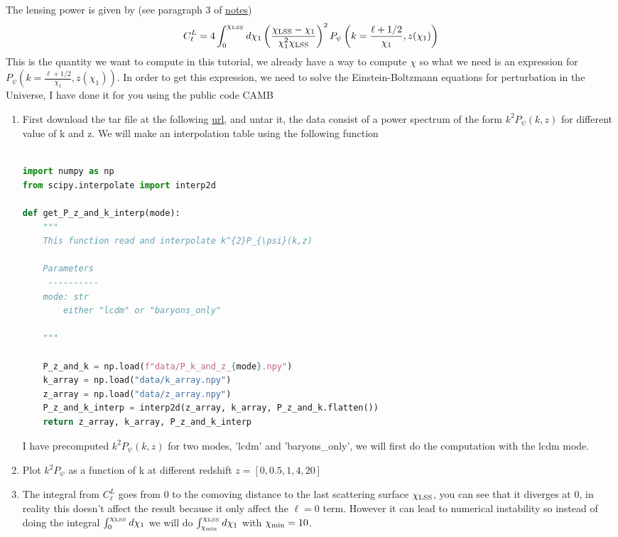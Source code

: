\documentclass[a4paper, 11pt]{article}
\def\ba{\begin{eqnarray}}
\def\ea{\end{eqnarray}}
\begin{document}
The lensing power is given by   (see paragraph 3 of \href{https://github.com/thibautlouis/thibautlouis.github.io/blob/master/derivation.pdf}{notes})
\ba
C^{L}_{\ell} =  4  \int^{\chi_{\rm LSS}}_{0}  d\chi_{1}  \left(\frac{\chi_{\rm LSS} - \chi_{1}}{\chi^{2}_{1}\chi_{\rm LSS} } \right)^{2}  P_{\psi} \left(k = \frac{\ell + 1/2}{\chi_{1}}, z(\chi_{1}) \right) 
\ea
This is the quantity we want to compute in this tutorial, we already have a way to compute $\chi$ so what we need is an expression for $P_{\psi} \left(k = \frac{\ell + 1/2}{\chi_{1}}, z(\chi_{1}) \right) $.
In order to get this expression, we need to solve the Einstein-Boltzmann equations for perturbation in the Universe, I have done it for you using the public code CAMB




\begin{enumerate}
\item First download the tar file at the following \href{https://github.com/thibautlouis/TD_ED_Phoeenix/blob/main/data.tar.gz}{url}, and untar it, the data consist of a power spectrum of the form $k^{2}P_{\psi}(k,z)$ for different value of k and z.
We will make an interpolation table using the following function  \\ \\
 \begin{lstlisting}[language=Python]
import numpy as np
from scipy.interpolate import interp2d

def get_P_z_and_k_interp(mode):
    """
    This function read and interpolate k^{2}P_{\psi}(k,z)
    
    Parameters
     ----------
    mode: str
        either "lcdm" or "baryons_only"

    """

    P_z_and_k = np.load(f"data/P_k_and_z_{mode}.npy")
    k_array = np.load("data/k_array.npy")
    z_array = np.load("data/z_array.npy")
    P_z_and_k_interp = interp2d(z_array, k_array, P_z_and_k.flatten())
    return z_array, k_array, P_z_and_k_interp

\end{lstlisting}
I have precomputed $k^{2}P_{\psi}(k,z)$   for two modes, 'lcdm' and 'baryons\_only', we will first do the computation with the lcdm mode.
\item Plot $k^{2}P_{\psi}$  as a function of k at different redshift $z = [0, 0.5, 1, 4 ,20]$
\item   The integral from $C^{L}_{\ell} $ goes from 0 to the comoving distance to the last scattering surface $\chi_{\rm LSS}$, you can see that it diverges at 0, in reality this doesn't affect the result because it only affect the $\ell =0$ term. However it can lead to numerical instability so instead of doing the integral  $\int^{\chi_{\rm LSS}}_{0}  d\chi_{1}$ we will do $\int^{\chi_{\rm LSS}}_{\chi_{\rm min}}  d\chi_{1}$ with $\chi_{\rm min}=10$.


\end{enumerate}
\end{document}
